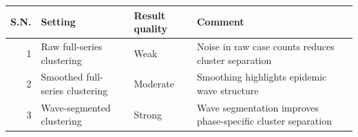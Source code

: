 \begin{tabular}{rlll}
\toprule
S.N. & Setting & Result quality & Comment \\
\midrule
1 & Raw full-series clustering & Weak & Noise in raw case counts reduces cluster separation \\
2 & Smoothed full-series clustering & Moderate & Smoothing highlights epidemic wave structure \\
3 & Wave-segmented clustering & Strong & Wave segmentation improves phase-specific cluster separation \\
\bottomrule
\end{tabular}
